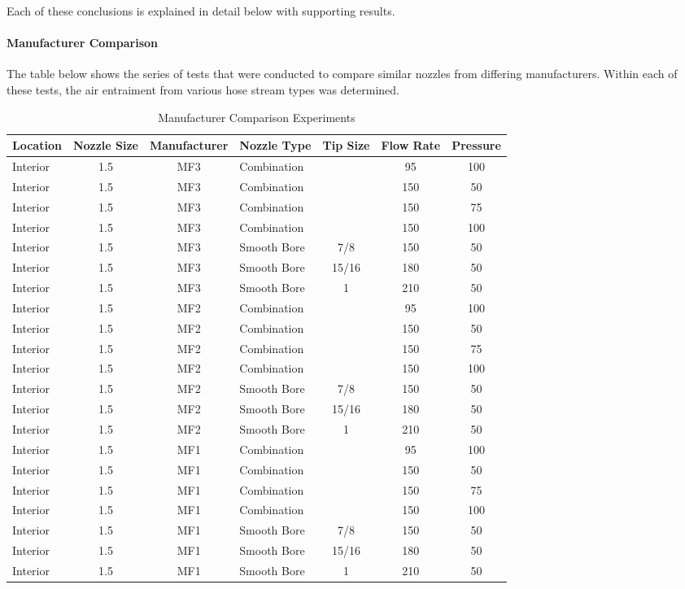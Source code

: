 \documentclass{article}
\begin{document}
Each of these conclusions is explained in detail below with supporting results.

\paragraph{Manufacturer Comparison}

\vspace*{\baselineskip}

The table below shows the series of tests that were conducted to compare similar nozzles from differing manufacturers. Within each of these tests, the air entraiment from various hose stream types was determined.

\vspace*{\baselineskip}

\begin{table}[!ht]
\centering
\caption{Manufacturer Comparison Experiments}
\label{Manufacturer_Comparison_Experiments}
\begin{tabular}{lcclccc}
\toprule[1.5pt]
Location & Nozzle Size & Manufacturer & Nozzle Type & Tip Size & Flow Rate & Pressure \\ 
\midrule
Interior & 1.5 & MF3 & Combination &  & 95 & 100 \\
Interior & 1.5 & MF3 & Combination &  & 150 & 50 \\
Interior & 1.5 & MF3 & Combination &  & 150 & 75 \\
Interior & 1.5 & MF3 & Combination &  & 150 & 100 \\
Interior & 1.5 & MF3 & Smooth Bore & 7/8 & 150 & 50 \\
Interior & 1.5 & MF3 & Smooth Bore & 15/16 & 180 & 50 \\
Interior & 1.5 & MF3 & Smooth Bore & 1 & 210 & 50 \\
Interior & 1.5 & MF2 & Combination &  & 95 & 100 \\
Interior & 1.5 & MF2 & Combination &  & 150 & 50 \\
Interior & 1.5 & MF2 & Combination &  & 150 & 75 \\
Interior & 1.5 & MF2 & Combination &  & 150 & 100 \\
Interior & 1.5 & MF2 & Smooth Bore & 7/8 & 150 & 50 \\
Interior & 1.5 & MF2 & Smooth Bore & 15/16 & 180 & 50 \\
Interior & 1.5 & MF2 & Smooth Bore & 1 & 210 & 50 \\
Interior & 1.5 & MF1 & Combination &  & 95 & 100 \\
Interior & 1.5 & MF1 & Combination &  & 150 & 50 \\
Interior & 1.5 & MF1 & Combination &  & 150 & 75 \\
Interior & 1.5 & MF1 & Combination &  & 150 & 100 \\
Interior & 1.5 & MF1 & Smooth Bore & 7/8 & 150 & 50 \\
Interior & 1.5 & MF1 & Smooth Bore & 15/16 & 180 & 50 \\
Interior & 1.5 & MF1 & Smooth Bore & 1 & 210 & 50 \\ 
\bottomrule[1.25pt]
\end{tabular}
\end{table}
\end{document}
